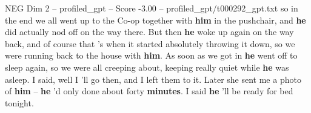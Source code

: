 \begin{textsample}{NEG Dim 2 – profiled\_gpt – Score -3.00 – profiled\_gpt/t000292\_gpt.txt}  \label{ex:f2_neg_036}
so in the end we all went up to the Co-op together with \textbf{him} in the pushchair, and \textbf{he} did actually nod off on the way there.
But then \textbf{he} woke up again on the way back, and of course that ’s when it started absolutely throwing it down, so we were running back to the house with \textbf{him}.
As soon as we got in \textbf{he} went off to sleep again, so we were all creeping about, keeping really quiet while \textbf{he} was asleep.
I said, well I ’ll go then, and I left them to it.
Later she sent me a photo of \textbf{him} – \textbf{he} ’d only done about forty \textbf{minutes}.
I said \textbf{he} ’ll be ready for bed tonight.

\end{textsample}
